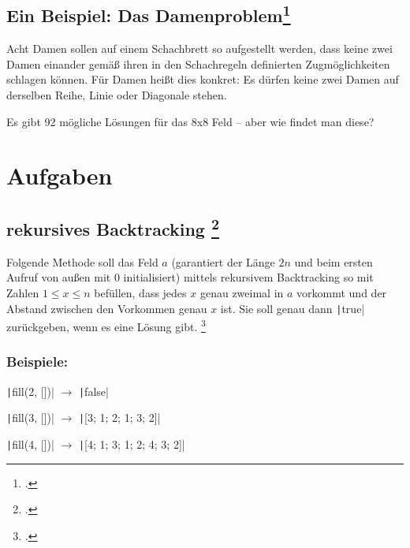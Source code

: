 \documentclass{lehramt-informatik}
\begin{document}
%

\section{Ein Beispiel: Das Damenproblem\footcite[Seite 18 - 19 (PDF 15-19)]{aud:fs:3}}

Acht Damen sollen auf einem Schachbrett so aufgestellt werden, dass
keine zwei Damen einander gemäß ihren in den Schachregeln definierten
Zugmöglichkeiten schlagen können. Für Damen heißt dies konkret: Es
dürfen keine zwei Damen auf derselben Reihe, Linie oder Diagonale
stehen.

Es gibt 92 mögliche Lösungen für das 8x8 Feld – aber wie findet man
diese?



\chapter{Aufgaben}

\section{rekursives Backtracking
\footcite{aud:pu:3}}

Folgende Methode soll das Feld $a$ (garantiert der Länge $2n$ und beim
ersten Aufruf von außen mit $0$ initialisiert) mittels rekursivem
Backtracking so mit Zahlen $1 \leq x \leq n$ befüllen, dass jedes $x$
genau zweimal in $a$ vorkommt und der Abstand zwischen den Vorkommen
genau $x$ ist. Sie soll genau dann \texttt|true| zurückgeben,
wenn es eine Lösung gibt.
\footcite[Seite 2]{aud:pu:3}

\subsection*{Beispiele:}

\begin{compactitem}
\item \texttt|fill(2, [])| $\rightarrow$ \texttt|false|
\item \texttt|fill(3, [])| $\rightarrow$ \texttt|[3; 1; 2; 1; 3; 2]|
\item \texttt|fill(4, [])| $\rightarrow$ \texttt|[4; 1; 3; 1; 2; 4; 3; 2]|
\end{compactitem}
\end{document}
